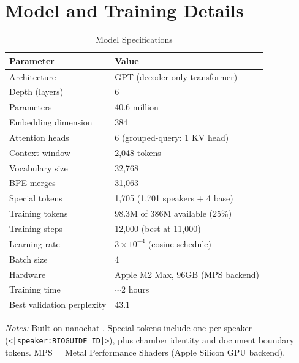 \documentclass[12pt]{article}
\begin{document}
\section{Model and Training Details}
\label{app:training}

\begin{table}[H]
\centering
\caption{Model Specifications}
\label{tab:model}
\begin{threeparttable}
\begin{tabular}{ll}
\toprule
Parameter & Value \\
\midrule
Architecture & GPT (decoder-only transformer) \\
Depth (layers) & 6 \\
Parameters & 40.6 million \\
Embedding dimension & 384 \\
Attention heads & 6 (grouped-query: 1 KV head) \\
Context window & 2,048 tokens \\
Vocabulary size & 32,768 \\
\quad BPE merges & 31,063 \\
\quad Special tokens & 1,705 (1,701 speakers + 4 base) \\
\midrule
Training tokens & 98.3M of 386M available (25\%) \\
Training steps & 12,000 (best at 11,000) \\
Learning rate & $3 \times 10^{-4}$ (cosine schedule) \\
Batch size & 4 \\
Hardware & Apple M2 Max, 96GB (MPS backend) \\
Training time & $\sim$2 hours \\
Best validation perplexity & 43.1 \\
\bottomrule
\end{tabular}
\begin{tablenotes}[flushleft]
\small
\item \textit{Notes:} Built on nanochat \citep{karpathy2025}. Special tokens include one per speaker (\texttt{<|speaker:BIOGUIDE\_ID|>}), plus chamber identity and document boundary tokens. MPS = Metal Performance Shaders (Apple Silicon GPU backend).
\end{tablenotes}
\end{threeparttable}
\end{table}
\end{document}
